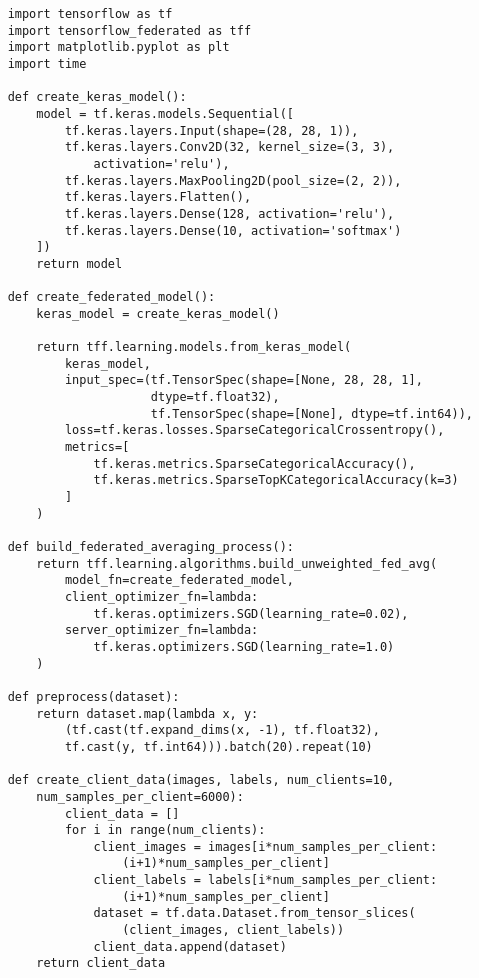 \begin{lstlisting}
    import tensorflow as tf
    import tensorflow_federated as tff
    import matplotlib.pyplot as plt
    import time

    def create_keras_model():
        model = tf.keras.models.Sequential([
            tf.keras.layers.Input(shape=(28, 28, 1)),
            tf.keras.layers.Conv2D(32, kernel_size=(3, 3), 
                activation='relu'),
            tf.keras.layers.MaxPooling2D(pool_size=(2, 2)),
            tf.keras.layers.Flatten(),
            tf.keras.layers.Dense(128, activation='relu'),
            tf.keras.layers.Dense(10, activation='softmax')
        ])
        return model

    def create_federated_model():
        keras_model = create_keras_model()

        return tff.learning.models.from_keras_model(
            keras_model,
            input_spec=(tf.TensorSpec(shape=[None, 28, 28, 1], 
                        dtype=tf.float32),
                        tf.TensorSpec(shape=[None], dtype=tf.int64)),
            loss=tf.keras.losses.SparseCategoricalCrossentropy(),
            metrics=[
                tf.keras.metrics.SparseCategoricalAccuracy(),
                tf.keras.metrics.SparseTopKCategoricalAccuracy(k=3)
            ]
        )

    def build_federated_averaging_process():
        return tff.learning.algorithms.build_unweighted_fed_avg(
            model_fn=create_federated_model,
            client_optimizer_fn=lambda: 
                tf.keras.optimizers.SGD(learning_rate=0.02),
            server_optimizer_fn=lambda: 
                tf.keras.optimizers.SGD(learning_rate=1.0)
        )

    def preprocess(dataset):
        return dataset.map(lambda x, y: 
            (tf.cast(tf.expand_dims(x, -1), tf.float32), 
            tf.cast(y, tf.int64))).batch(20).repeat(10)

    def create_client_data(images, labels, num_clients=10, 
        num_samples_per_client=6000):
            client_data = []
            for i in range(num_clients):
                client_images = images[i*num_samples_per_client:
                    (i+1)*num_samples_per_client]
                client_labels = labels[i*num_samples_per_client:
                    (i+1)*num_samples_per_client]
                dataset = tf.data.Dataset.from_tensor_slices(
                    (client_images, client_labels))
                client_data.append(dataset)
        return client_data


\end{lstlisting}
